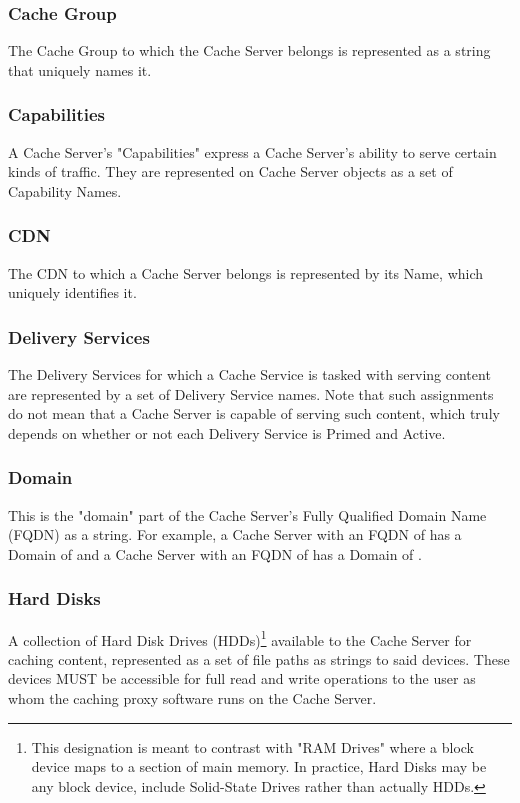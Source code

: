 \subsubsection{Cache Group}
The Cache Group to which the Cache Server belongs is represented as a string
that uniquely names it.

\subsubsection{Capabilities}
A Cache Server's "Capabilities" express a Cache Server's ability to serve
certain kinds of traffic. They are represented on Cache Server objects as a set
of Capability Names.

\subsubsection{CDN}
The CDN to which a Cache Server belongs is represented by its Name, which
uniquely identifies it.

\subsubsection{Delivery Services}
The Delivery Services for which a Cache Service is tasked with serving content
are represented by a set of Delivery Service names. Note that such assignments
do not mean that a Cache Server is capable of serving such content, which truly
depends on whether or not each Delivery Service is Primed and Active.

\subsubsection{Domain}
This is the "domain" part of the Cache Server's Fully Qualified Domain Name
(FQDN) as a string. For example, a Cache Server with an FQDN of
 has a Domain of  and a Cache Server with an FQDN of
 has a Domain of .

\subsubsection{Hard Disks}
A collection of Hard Disk Drives (HDDs)\footnote{This designation is meant to
contrast with "RAM Drives" where a block device maps to a section of main
memory. In practice, Hard Disks may be any block device, include Solid-State
Drives rather than actually HDDs.} available to the Cache Server for caching
content, represented as a set of file paths as strings to said devices. These
devices MUST be accessible for full read and write operations to the user as
whom the caching proxy software runs on the Cache Server.

